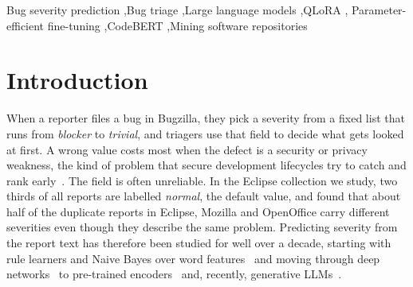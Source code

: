 \documentclass[a4paper,fleqn]{cas-sc}
\newif\ifjournalversion
\begin{document}
\ifjournalversion
\begin{highlights}
\item Eleven severity classifiers are scored on the same 2,000 Eclipse bug reports
\item Zero-shot Llama 3 and Qwen 2.5 score below every TF-IDF classifier
\item Fine-tuned Llama 3 8B shows no detectable difference from fine-tuned CodeBERT
\item 8\% of test reports duplicate training ones; TF-IDF scores drop when removed
\item Fine-tuned Llama 3 labels most of the Critical reports it misses as Major
\end{highlights}
\fi

\begin{keywords}
Bug severity prediction \sep Bug triage \sep Large language models \sep QLoRA \sep
Parameter-efficient fine-tuning \sep CodeBERT \sep Mining software repositories
\end{keywords}

\maketitle

\section{Introduction}
\label{sec:intro}

When a reporter files a bug in Bugzilla, they pick a severity from a fixed list that
runs from \textit{blocker} to \textit{trivial}, and triagers use that field to decide
what gets looked at first. A wrong value costs most when the defect is a security or
privacy weakness, the kind of problem that secure development lifecycles try to catch
and rank early~\citep{bayan2023exploring,bayan2025permissionless}. The field is often
unreliable. In the Eclipse collection we
study, two thirds of all reports are labelled \textit{normal}, the default value, and
\citet{tian2016unreliability} found that about half of the duplicate reports in
Eclipse, Mozilla and OpenOffice carry different severities even though they describe
the same problem. Predicting severity from the report text has therefore been studied
for well over a decade, starting with rule learners and Naive Bayes over word
features~\citep{menzies2008automated,lamkanfi2010predicting} and moving through deep
networks~\citep{ramay2019deep,dao2021severity} to pre-trained
encoders~\citep{ali2024bert,agarwal2026finetuning} and, recently, generative
LLMs~\citep{oliveira2024predictive,arshad2024sevpredict,ali2025retrieval}.
\end{document}
